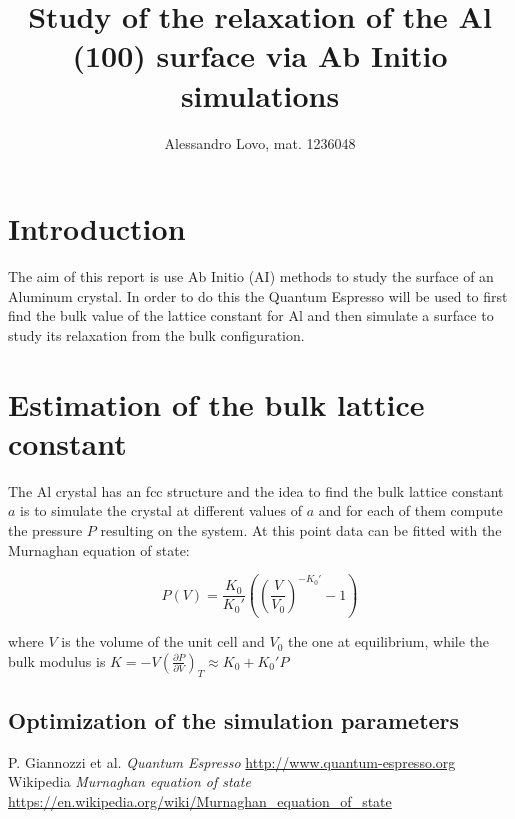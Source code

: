 \documentclass[a4paper, 11pt]{article}
\begin{document}
\title{Study of the relaxation of the Al (100) surface via Ab Initio simulations}
\author{Alessandro Lovo, mat. 1236048}

\maketitle

\section{Introduction}
  The aim of this report is use Ab Initio (AI) methods to study the surface of an Aluminum crystal. In order to do this the Quantum Espresso \cite{rif:QE} will be used to first find the bulk value of the lattice constant for Al and then simulate a surface to study its relaxation from the bulk configuration.

\section{Estimation of the bulk lattice constant}
  The Al crystal has an fcc structure and the idea to find the bulk lattice constant $a$ is to simulate the crystal at different values of $a$ and for each of them compute the pressure $P$ resulting on the system. At this point data can be fitted with the Murnaghan equation of state:

  \begin{equation*}
    P(V) = \frac{K_0}{K_0'}\left(\left(\frac{V}{V_0} \right)^{-K_0'} - 1 \right)
  \end{equation*}

  where $V$ is the volume of the unit cell and $V_0$ the one at equilibrium, while the bulk modulus is $K = -V \left(\frac{\partial P}{\partial V}\right)_T \approx K_0 + K_0'P$
  \subsection{Optimization of the simulation parameters}






\begin{thebibliography}{100}
   P. Giannozzi et al. \emph{Quantum Espresso}  \url{http://www.quantum-espresso.org}
   Wikipedia \emph{Murnaghan equation of state}  \url{https://en.wikipedia.org/wiki/Murnaghan_equation_of_state}
\end{thebibliography}
\end{document}
